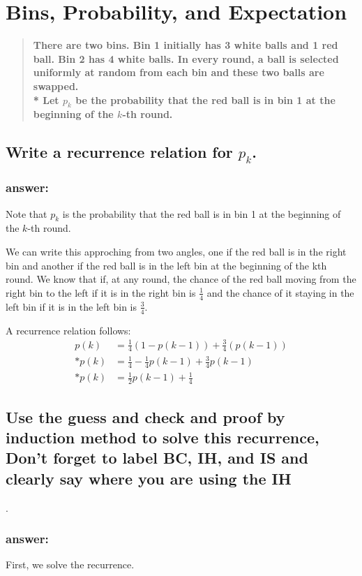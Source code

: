 \documentclass[titlepage]{article}
\theoremstyle{definition}
\begin{document}
\section{Bins, Probability, and Expectation}
\begin{quote}
  \textbf{There are two bins. Bin 1 initially has 3 white balls and 1 red ball.
  Bin 2 has 4 white balls. In every round, a ball is selected uniformly at
  random from each bin and these two balls are swapped. \\*
  Let $p_k$ be the probability that the red ball is in bin 1 at the beginning of
  the $k$-th round.}
\end{quote}

\subsection{ Write a recurrence relation for $p_k$. }
  \subsubsection{answer:}
    Note that $p_k$ is the probability that the red ball is in bin 1 at the beginning of
    the $k$-th round.

    We can write this approching from two angles, one if the red ball is in the
    right bin and another if the red ball is in the left bin at the beginning of
    the kth round. 
    We know that if, at any round, the chance of the red ball moving from the right
    bin to the left if it is in the right bin is $\frac{1}{4}$ and the chance of it
    staying in the left bin if it is in the left bin is $\frac{3}{4}$. 

    A recurrence relation follows:
    \begin{align}
      p(k) & = \frac{1}{4}\left(1 - p(k-1)\right) + \frac{3}{4}\left(p\left(k-1\right)\right) \\*
      p(k) & = \frac{1}{4} - \frac{1}{4}p(k-1) + \frac{3}{4}p(k-1) \\*
      p(k) & = \frac{1}{2}p(k-1) + \frac{1}{4} 
    \end{align}


\subsection{Use the guess and check and proof by induction method to solve this
	recurrence, Don't forget to label BC, IH, and IS and clearly say where you
	are using the IH}.
  \subsubsection{answer:}
    First, we solve the recurrence.
\end{document}
